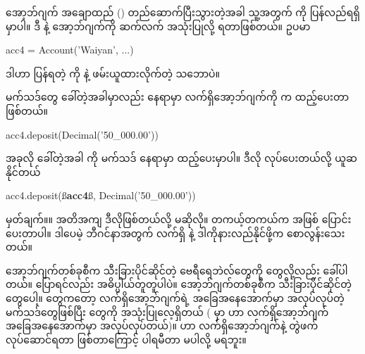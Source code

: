 အော့ဘ်ဂျက် အချောထည် () တည်ဆောက်ပြီးသွားတဲ့အခါ သူ့အတွက်  ကို ပြန်လည်ရရှိမှာပါ။ ဒီ  နဲ့ အော့ဘ်ဂျက်ကို ဆက်လက် အသုံးပြုလို့ ရတာဖြစ်တယ်။ ဥပမာ  
%
\begin{py}
acc4 = Account('Waiyan', ...)
\end{py}
%
ဒါဟာ ပြန်ရတဲ့  ကို  နဲ့ ဖမ်းယူထားလိုက်တဲ့ သဘောပဲ။ 


\fEn{,}   မက်သဒ်တွေ ခေါ်တဲ့အခါမှာလည်း    နေရာမှာ လက်ရှိအော့ဘ်ဂျက်ကို  က ထည့်ပေးတာ ဖြစ်တယ်။ 
%
\begin{py}
acc4.deposit(Decimal('50_000.00'))
\end{py}
%
အခုလို ခေါ်တဲ့အခါ  ကို  မက်သဒ်  နေရာမှာ ထည့်ပေးမှာပါ။ ဒီလို  လုပ်ပေးတယ်လို့ ယူဆနိုင်တယ်
%
\begin{py}
acc4.deposit(ß\textbf{acc4}ß, Decimal('50_000.00'))
\end{py}
%
မှတ်ချက်။\qquad ။ အတိအကျ ဒီလိုဖြစ်တယ်လို့ မဆိုလို။ တကယ့်တကယ်က  အဖြစ် ပြောင်းပေးတာပါ။ ဒါပေမဲ့ ဘီဂင်နာအတွက် လက်ရှိ  နဲ့ ဒါကိုနားလည်နိုင်ဖို့က စောလွန်းသေးတယ်။


\begin{mytcbox}
\betweentcboxpar
အော့ဘ်ဂျက်တစ်ခုစီက သီးခြားပိုင်ဆိုင်တဲ့ ဗေရီရေဘဲလ်တွေကို  တွေလို့လည်း ခေါ်ပါတယ်။  ပြောရင်လည်း အဓိပ္ပါယ်တူတူပါပဲ။ အော့ဘ်ဂျက်တစ်ခုစီက သီးခြားပိုင်ဆိုင်တဲ့  တွေပေါ့။ 
\betweentcboxpar
{} တွေကတော့ လက်ရှိအော့ဘ်ဂျက်ရဲ့ အခြေအနေအောက်မှာ အလုပ်လုပ်တဲ့ မက်သဒ်တွေဖြစ်ပြီး   တွေကို အသုံးပြုလေ့ရှိတယ် ( မှာ  ဟာ လက်ရှိအော့ဘ်ဂျက်   အခြေအနေအောက်မှာ အလုပ်လုပ်တယ်)။  ဟာ လက်ရှိအော့ဘ်ဂျက်နဲ့ တွဲဖက်လုပ်ဆောင်ရတာ ဖြစ်တာကြောင့်  ပါရမီတာ မပါလို့ မရဘူး။ 
\end{mytcbox}


